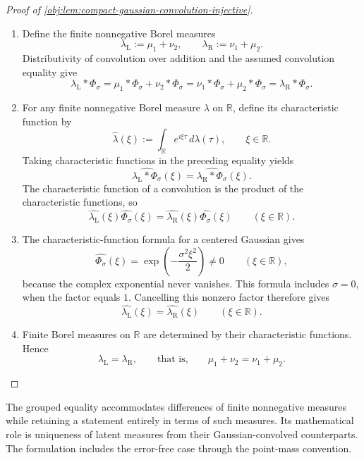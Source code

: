 \documentclass[11pt]{article}
\begin{document}
\begin{proof}[Proof of \cref{obj:lem:compact-gaussian-convolution-injective}]
\begin{enumerate}
\item Define the finite nonnegative Borel measures
\[
\lambda_{\mathrm L}:=\mu_1+\nu_2,
\qquad
\lambda_{\mathrm R}:=\nu_1+\mu_2.
\]
Distributivity of convolution over addition and the assumed convolution equality give
\[
\lambda_{\mathrm L}*\Phi_\sigma
=\mu_1*\Phi_\sigma+\nu_2*\Phi_\sigma
=\nu_1*\Phi_\sigma+\mu_2*\Phi_\sigma
=\lambda_{\mathrm R}*\Phi_\sigma.
\]

\item For any finite nonnegative Borel measure \(\lambda\) on \(\mathbb R\), define its characteristic function by
\[
\widehat{\lambda}(\xi)
:=\int_{\mathbb R}e^{i\xi\tau}\,d\lambda(\tau),
\qquad \xi\in\mathbb R.
\]
Taking characteristic functions in the preceding equality yields
\[
\widehat{\lambda_{\mathrm L}*\Phi_\sigma}(\xi)
=
\widehat{\lambda_{\mathrm R}*\Phi_\sigma}(\xi).
\]
The characteristic function of a convolution is the product of the characteristic functions, so
\[
\widehat{\lambda_{\mathrm L}}(\xi)\widehat{\Phi_\sigma}(\xi)
=
\widehat{\lambda_{\mathrm R}}(\xi)\widehat{\Phi_\sigma}(\xi)
\qquad(\xi\in\mathbb R).
\]

\item The characteristic-function formula for a centered Gaussian gives
\[
\widehat{\Phi_\sigma}(\xi)
=\exp\!\left(-\frac{\sigma^2\xi^2}{2}\right)\ne0
\qquad(\xi\in\mathbb R),
\]
because the complex exponential never vanishes. This formula includes \(\sigma=0\), when the factor equals \(1\). Cancelling this nonzero factor therefore gives
\[
\widehat{\lambda_{\mathrm L}}(\xi)
=
\widehat{\lambda_{\mathrm R}}(\xi)
\qquad(\xi\in\mathbb R).
\]

\item Finite Borel measures on \(\mathbb R\) are determined by their characteristic functions. Hence
\[
\lambda_{\mathrm L}=\lambda_{\mathrm R},
\qquad\text{that is,}\qquad
\mu_1+\nu_2=\nu_1+\mu_2.
\]
\end{enumerate}
\end{proof}

The grouped equality accommodates differences of finite nonnegative measures while retaining a statement entirely in terms of such measures. Its mathematical role is uniqueness of latent measures from their Gaussian-convolved counterparts. The formulation includes the error-free case through the point-mass convention.
\end{document}
